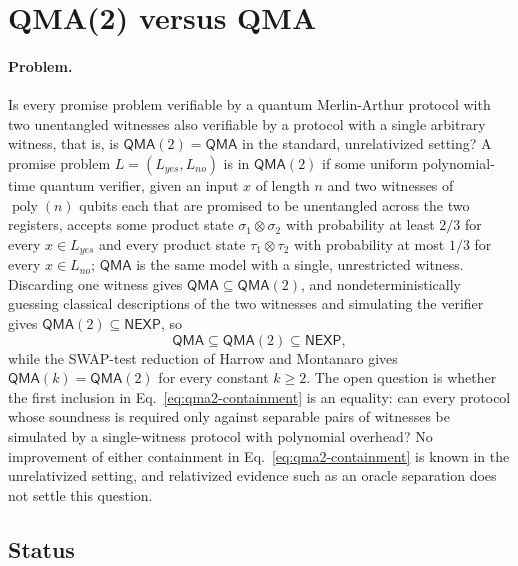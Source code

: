 \section{QMA(2) versus QMA}
\label{sec:op_61cc0e261b3889c6}

\paragraph{Problem.}
Is every promise problem verifiable by a quantum Merlin-Arthur protocol
with two unentangled witnesses also verifiable by a protocol with a single
arbitrary witness, that is, is $\mathsf{QMA}(2) = \mathsf{QMA}$ in the
standard, unrelativized setting?  A promise problem $L = (L_{yes}, L_{no})$
is in $\mathsf{QMA}(2)$ if some uniform polynomial-time quantum verifier,
given an input $x$ of length $n$ and two witnesses of $\operatorname{poly}(n)$
qubits each that are promised to be unentangled across the two registers,
accepts some product state $\sigma_1 \otimes \sigma_2$ with probability at
least $2/3$ for every $x \in L_{yes}$ and every product state
$\tau_1 \otimes \tau_2$ with probability at most $1/3$ for every
$x \in L_{no}$; $\mathsf{QMA}$ is the same model with a single,
unrestricted witness.  Discarding one witness gives
$\mathsf{QMA} \subseteq \mathsf{QMA}(2)$, and nondeterministically guessing
classical descriptions of the two witnesses and simulating the verifier
gives $\mathsf{QMA}(2) \subseteq \mathsf{NEXP}$, so
\begin{equation}
  \mathsf{QMA} \subseteq \mathsf{QMA}(2) \subseteq \mathsf{NEXP},
  \label{eq:qma2-containment}
\end{equation}
while the SWAP-test reduction of Harrow and Montanaro gives
$\mathsf{QMA}(k) = \mathsf{QMA}(2)$ for every constant $k \ge 2$.  The open
question is whether the first inclusion in Eq.~\eqref{eq:qma2-containment}
is an equality: can every protocol whose soundness is required only against
separable pairs of witnesses be simulated by a single-witness protocol with
polynomial overhead?  No improvement of either containment in
Eq.~\eqref{eq:qma2-containment} is known in the unrelativized setting, and
relativized evidence such as an oracle separation does not settle this
question.

\subsection*{Status}

